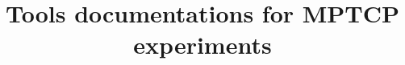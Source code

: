 \documentclass[a4paper,10pt]{article}
\title{Tools documentations for MPTCP experiments}
\author{}
\begin{document}
\maketitle

\begin{abstract}

\end{abstract}



\end{document}
